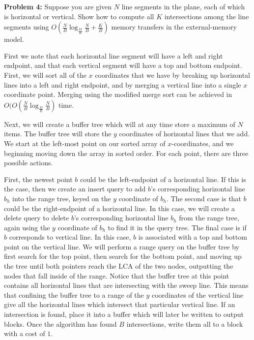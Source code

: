 \documentclass[psamsfonts]{amsart}
\newenvironment{sol}{\vspace{0.25cm}{\large \bfseries Solution:}}{\qedsymbol}
\newenvironment{prob}[1]{\begin{framed}{\large \bfseries Problem #1:}}{\end{framed}}
\begin{document}
\begin{prob}{4}
Suppose you are given $N$ line segments in the plane, each of which is horizontal or vertical. Show how to compute all $K$ intersections among the line segments using $O(\frac{N}{B} \log_{\frac{M}{B}} \frac{N}{B} + \frac{K}{B})$ memory transfers in the external-memory model. 
\end{prob}
\begin{sol}
First we note that each horizontal line segment will have a left and right endpoint, and that each vertical segment will have a top and bottom endpoint. First, we will sort all of the $x$ coordinates that we have by breaking up horizontal lines into a left and right endpoint, and by merging a vertical line into a single $x$ coordinate point. Merging using the modified merge sort can be achieved in $O(O(\frac{N}{B} \log_{\frac{M}{B}} \frac{N}{B} )$ time. 

Next, we will create a buffer tree which will at any time store a maximum of $N$ items. The buffer tree will store the $y$ coordinates of horizontal lines that we add. We start at the left-most point on our sorted array of $x$-coordinates, and we beginning moving down the array in sorted order. For each point, there are three possible actions.

First, the newest point $b$ could be the left-endpoint of a horizontal line. If this is the case, then we create an insert query to add $b$'s corresponding horizontal line $b_h$ into the range tree, keyed on the $y$ coordinate of $b_h$. The second case is that $b$ could be the right-endpoint of a horizontal line. In this case, we will create a delete query to delete $b$'s corresponding horizontal line $b_h$ from the range tree, again using the $y$ coordinate of $b_h$ to find it in the query tree. The final case is if $b$ corresponds to vertical line. In this case, $b$ is associated with a top and bottom point on the vertical line. We will perform a range query on the buffer tree by first search for the top point, then search for the bottom point, and moving up the tree until both pointers reach the LCA of the two nodes, outputting the nodes that fall inside of the range. Notice that the buffer tree at this point contains all horizontal lines that are intersecting with the sweep line. This means that confining the buffer tree to a range of the $y$ coordinates of the vertical line give all the horizontal lines which intersect that particular vertical line. If an intersection is found, place it into a buffer which will later be written to output blocks. Once the algorithm has found $B$ intersections, write them all to a block with a cost of $1$.


\end{sol}
\end{document}
